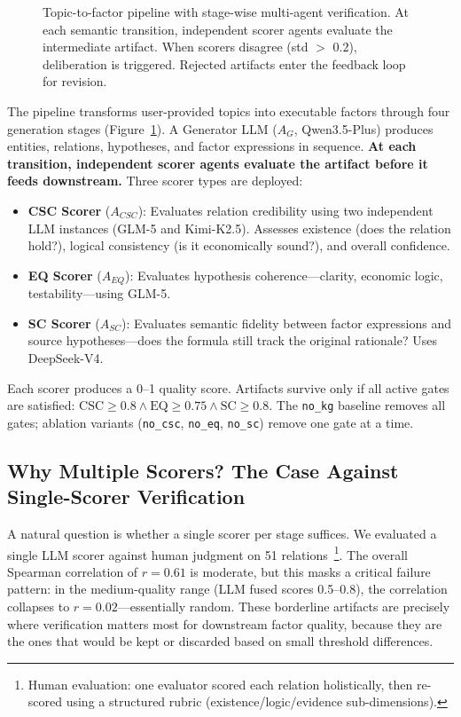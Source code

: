 \documentclass[sigconf]{acmart}
\begin{document}
\begin{figure}[t]
\caption{Topic-to-factor pipeline with stage-wise multi-agent verification. At each semantic transition, independent scorer agents evaluate the intermediate artifact. When scorers disagree (std $>$ 0.2), deliberation is triggered. Rejected artifacts enter the feedback loop for revision.}
\label{fig:pipeline}
\end{figure}

The pipeline transforms user-provided topics into executable factors through four generation stages (Figure~\ref{fig:pipeline}). A Generator LLM ($A_G$, Qwen3.5-Plus) produces entities, relations, hypotheses, and factor expressions in sequence. \textbf{At each transition, independent scorer agents evaluate the artifact before it feeds downstream.} Three scorer types are deployed:

\begin{itemize}
    \item \textbf{CSC Scorer} ($A_{CSC}$): Evaluates relation credibility using two independent LLM instances (GLM-5 and Kimi-K2.5). Assesses existence (does the relation hold?), logical consistency (is it economically sound?), and overall confidence.
    \item \textbf{EQ Scorer} ($A_{EQ}$): Evaluates hypothesis coherence---clarity, economic logic, testability---using GLM-5.
    \item \textbf{SC Scorer} ($A_{SC}$): Evaluates semantic fidelity between factor expressions and source hypotheses---does the formula still track the original rationale? Uses DeepSeek-V4.
\end{itemize}

Each scorer produces a 0--1 quality score. Artifacts survive only if all active gates are satisfied: $\text{CSC} \ge 0.8 \land \text{EQ} \ge 0.75 \land \text{SC} \ge 0.8$. The \texttt{no\_kg} baseline removes all gates; ablation variants (\texttt{no\_csc}, \texttt{no\_eq}, \texttt{no\_sc}) remove one gate at a time.

\subsection{Why Multiple Scorers? The Case Against Single-Scorer Verification}

A natural question is whether a single scorer per stage suffices. We evaluated a single LLM scorer against human judgment on 51 relations~\footnote{Human evaluation: one evaluator scored each relation holistically, then re-scored using a structured rubric (existence/logic/evidence sub-dimensions).}. The overall Spearman correlation of $r{=}0.61$ is moderate, but this masks a critical failure pattern: in the medium-quality range (LLM fused scores 0.5--0.8), the correlation collapses to $r{=}0.02$---essentially random. These borderline artifacts are precisely where verification matters most for downstream factor quality, because they are the ones that would be kept or discarded based on small threshold differences.
\end{document}
